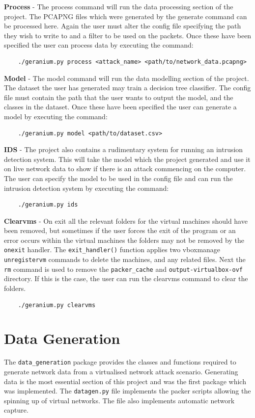 \textbf{Process} - The process command will run the data processing section of the project. The PCAPNG files which were generated by the generate command can be processed here. Again the user must alter the config file specifying the path they wish to write to and a filter to be used on the packets. Once these have been specified the user can process data by executing the command:

\begin{verbatim}
    ./geranium.py process <attack_name> <path/to/network_data.pcapng>
\end{verbatim}

\textbf{Model} - The model command will run the data modelling section of the project. The dataset the user has generated may train a decision tree classifier. The config file must contain the path that the user wants to output the model, and the classes in the dataset. Once these have been specified the user can generate a model by executing the command:
\begin{verbatim}
    ./geranium.py model <path/to/dataset.csv>
\end{verbatim}

\textbf{IDS} - The project also contains a rudimentary system for running an intrusion detection system. This will take the model which the project generated and use it on live network data to show if there is an attack commencing on the computer. The user can specify the model to be used in the config file and can run the intrusion detection system by executing the command:
\begin{verbatim}
    ./geranium.py ids
\end{verbatim}

\textbf{Clearvms} - On exit all the relevant folders for the virtual machines should have been removed, but sometimes if the user forces the exit of the program or an error occurs within the virtual machines the folders may not be removed by the \texttt{onexit} handler. The \texttt{exit\_handler()} function applies two vboxmanage \texttt{unregistervm} commands to delete the machines, and any related files. Next the \texttt{rm} command is used to remove the \texttt{packer\_cache} and \texttt{output-virtualbox-ovf} directory. If this is the case, the user can run the clearvms command to clear the folders.
\begin{verbatim}
    ./geranium.py clearvms
\end{verbatim}

\section{Data Generation}
The \texttt{data\_generation} package provides the classes and functions required to generate network data from a virtualised network attack scenario. Generating data is the most essential section of this project and was the first package which was implemented. The \texttt{datagen.py} file implements the packer scripts allowing the spinning up of virtual networks. The file also implements automatic network capture.
